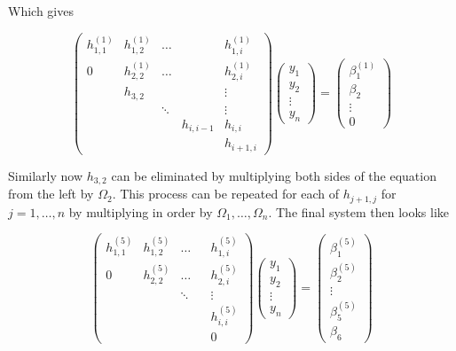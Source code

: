\documentclass{article}
\begin{document}
\begin{enumerate}
\begin{enumerate}
		Which gives
		
		$$
		\begin{pmatrix}
	    h_{1,1}^{(1)} & h_{1,2}^{(1)} & \dots && h_{1,i}^{(1)} \\
	    0 & h_{2,2}^{(1)} & \dots && h_{2,i}^{(1)} \\
	    & h_{3,2} & && \vdots \\
	    && \ddots && \vdots\\ 
	    & && h_{i,i-1} & h_{i,i} \\
	    & & && h_{i+1,i}
		\end{pmatrix}
		\begin{pmatrix}
		y_1\\
		y_2\\
		\vdots \\
		y_n
		\end{pmatrix} = 
		\begin{pmatrix}
		\beta_1^{(1)}\\
		\beta_2\\
		\vdots \\
		0
		\end{pmatrix}
		$$
		
		Similarly now $h_{3,2}$ can be eliminated by multiplying both sides of the equation from the left by $\Omega_2$. This process can be repeated for each of $h_{j+1,j}$ for $j=1,\dots,n$ by multiplying in order by $\Omega_1, \dots, \Omega_n$. The final system then looks like
		
		$$
		\begin{pmatrix}
	    h_{1,1}^{(5)} & h_{1,2}^{(5)} & \dots && h_{1,i}^{(5)} \\
	    0 & h_{2,2}^{(5)} & \dots && h_{2,i}^{(5)} \\
	    & & \ddots && \vdots \\
	    & && & h_{i,i}^{(5)} \\
	    & & && 0
		\end{pmatrix}
		\begin{pmatrix}
		y_1\\
		y_2\\
		\vdots \\
		y_n
		\end{pmatrix} = 
		\begin{pmatrix}
		\beta_1^{(5)}\\
		\beta_2^{(5)}\\
		\vdots \\
		\beta_5^{(5)} \\
		\beta_6
		\end{pmatrix}
		$$
		

\end{enumerate}
\end{enumerate}
\end{document}
